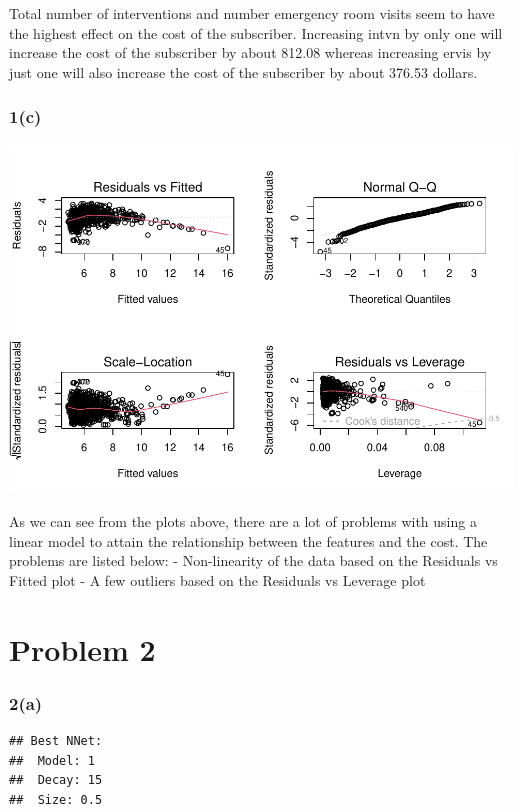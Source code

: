 \documentclass[
]{article}
\begin{document}
Total number of interventions and number emergency room visits seem to
have the highest effect on the cost of the subscriber. Increasing intvn
by only one will increase the cost of the subscriber by about 812.08
whereas increasing ervis by just one will also increase the cost of the
subscriber by about 376.53 dollars.

\hypertarget{c}{%
\subsubsection{1(c)}\label{c}}

\includegraphics{hw02_files/figure-latex/question_1c-1.pdf}

As we can see from the plots above, there are a lot of problems with
using a linear model to attain the relationship between the features and
the cost. The problems are listed below: - Non-linearity of the data
based on the Residuals vs Fitted plot - A few outliers based on the
Residuals vs Leverage plot

\hypertarget{problem-2}{%
\section{Problem 2}\label{problem-2}}

\hypertarget{a-1}{%
\subsubsection{2(a)}\label{a-1}}

\begin{verbatim}
## Best NNet: 
##  Model: 1 
##  Decay: 15 
##  Size: 0.5
\end{verbatim}
\end{document}

